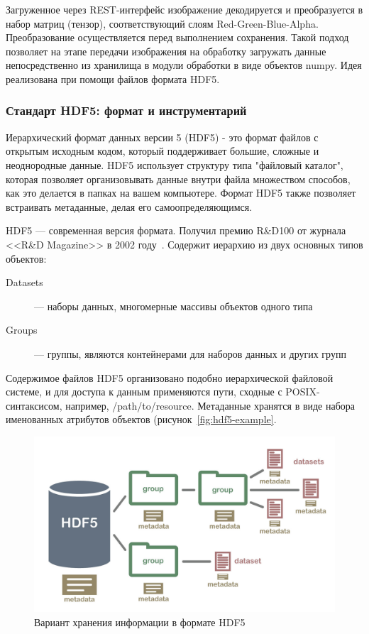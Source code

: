 \documentclass[732,14pt,final]{studrep}
\begin{document}
Загруженное через REST-интерфейс изображение декодируется и преобразуется в набор матриц (тензор), соответствующий слоям Red-Green-Blue-Alpha. Преобразование осуществляется перед выполнением сохранения. Такой подход позволяет на этапе передачи изображения на обработку загружать данные непосредственно из хранилища в модули обработки в виде объектов numpy. Идея реализована при помощи файлов формата HDF5.

\subsubsection{Стандарт HDF5: формат и инструментарий}

Иерархический формат данных версии 5 (HDF5) - это формат файлов с открытым исходным кодом, который поддерживает большие, сложные и неоднородные данные. HDF5 использует структуру типа "файловый каталог", которая позволяет организовывать данные внутри файла множеством способов, как это делается в папках на вашем компьютере. Формат HDF5 также позволяет встраивать метаданные, делая его самоопределяющимся.

HDF5 — современная версия формата. Получил премию R\&D100 от журнала <<R\&D Magazine>> в 2002 году~\cite{}.
Содержит иерархию из двух основных типов объектов:
\begin{description}
\item [Datasets] — наборы данных, многомерные массивы объектов одного типа
\item [Groups] — группы, являются контейнерами для наборов данных и других групп
\end{description}

Содержимое файлов HDF5 организовано подобно иерархической файловой системе, и для доступа к данным применяются пути, сходные с POSIX-синтаксисом, например, /path/to/resource. Метаданные хранятся в виде набора именованных атрибутов объектов (рисунок~\ref{fig:hdf5-example}.
  \begin{figure}[htp]
    \centering
    \includegraphics[width=0.7\linewidth]{pics/hdf5_structure4.jpg}
    \caption{Вариант хранения информации в формате HDF5}
    \label{fig:hfd5-example}
  \end{figure}
\end{document}
